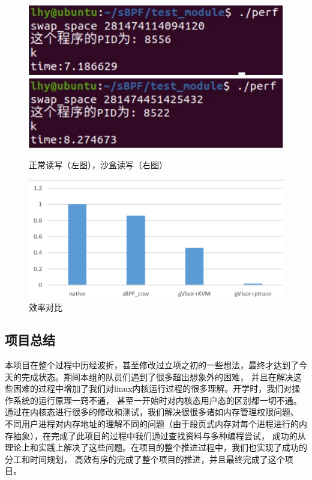 \documentclass[AutoFakeBold,a4paper]{ctexart}
\begin{document}
\begin{figure}[H]
    \centering
    \includegraphics[width=0.49\columnwidth]{pic11.png}
    \includegraphics[width=0.49\columnwidth]{pic12.png}
    \caption{正常读写（左图），沙盒读写（右图）}
\end{figure}

\begin{figure}[H]
    \centering
    \includegraphics[width=\columnwidth]{pic13.png}
    \caption{效率对比}
\end{figure}

\subsection{项目总结}
本项目在整个过程中历经波折，甚至修改过立项之初的一些想法，最终才达到了今天的完成状态。期间本组的队员们遇到了很多超出想象外的困难，
并且在解决这些困难的过程中增加了我们对linux内核运行过程的很多理解。开学时，我们对操作系统的运行原理一窍不通，
甚至一开始时对内核态用户态的区别都一切不通。通过在内核态进行很多的修改和测试，我们解决很很多诸如内存管理权限问题、
不同用户进程对内存地址的理解不同的问题（由于段页式内存对每个进程进行的内存抽象），在完成了此项目的过程中我们通过查找资料与多种编程尝试，
成功的从理论上和实践上解决了这些问题。在项目的整个推进过程中，我们也实现了成功的分工和时间规划，
高效有序的完成了整个项目的推进，并且最终完成了这个项目。



\end{document}
